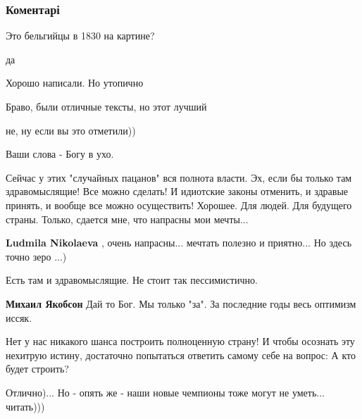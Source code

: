  
 
 
 
 
\subsubsection{Коментарі}
\label{sec:24_07_2019.fb.lesev_igor.1.nacidea.cmt}

\begin{itemize} %
Это бельгийцы в 1830 на картине?

да

Хорошо написали. Но утопично

Браво, были отличные тексты, но этот лучший

не, ну если вы это отметили))

Ваши слова - Богу в ухо.


Сейчас у этих "случайных пацанов" вся полнота власти. Эх, если бы только там
здравомыслящие! Все можно сделать! И идиотские законы отменить, и здравые
принять, и вообще все можно осуществить! Хорошее. Для людей. Для будущего
страны. Только, сдается мне, что напрасны мои мечты...

\begin{itemize} %
\textbf{Ludmila Nikolaeva} , очень напрасны... мечтать полезно и приятно... Но здесь точно зеро ...)

Есть там и здравомыслящие.
Не стоит так пессимистично.

\textbf{Михаил Якобсон} Дай то Бог. Мы только "за". За последние годы весь оптимизм иссяк.
\end{itemize} %


Нет у нас никакого шанса построить полноценную страну! И чтобы осознать эту
нехитрую истину, достаточно попытаться ответить самому себе на вопрос: А кто
будет строить?


Отлично)... Но - опять же - наши новые чемпионы тоже могут не уметь... читать)))


\end{itemize}
